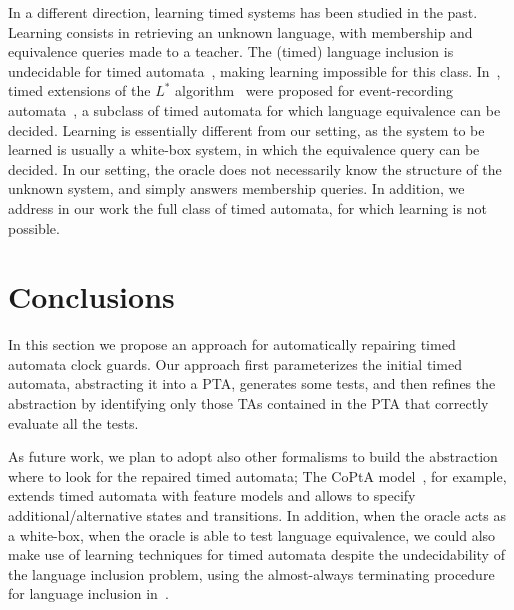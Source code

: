 \begin{tikzborder}{\cite{Gargantini16:validation}}
\begin{tikzborder}{\cite{gargantini_combinatorial_2017}}
\begin{tikzborder}{\cite{garn2019}}
\begin{tikzborder}{\cite{arcaini2019achieving}}
\begin{tikzborder}{\cite{arcaini2019varivolution}}


\vspace{5pt}

In a different direction, learning timed systems has been studied in the past.
Learning consists in retrieving an unknown language, with membership and equivalence queries made to a teacher.
The (timed) language inclusion is undecidable for timed automata~\cite{AD94}, making learning impossible for this class.
In~\cite{GJL10,LALSD14}, timed extensions of the $L^*$ algorithm~\cite{Angluin87} were proposed for event-recording automata~\cite{AFH99}, a subclass of timed automata for which language equivalence can be decided.
Learning is essentially different from our setting, as the system to be learned is usually a white-box system, in which the equivalence query can be decided.
In our setting, the oracle does not necessarily know the structure of the unknown system, and simply answers membership queries.
In addition, we address in our work the full class of timed automata, for which learning is not possible.
\end{tikzborder}


\section{Conclusions}\label{sec:conclusions2}

In this section we propose an approach for automatically repairing timed automata clock guards.
Our approach first parameterizes the initial timed automata, abstracting it into a PTA, generates some tests, and then refines the abstraction by identifying only those TAs contained in the PTA that correctly evaluate all the tests.

As future work, we plan to adopt also other formalisms to build the abstraction where to look for the repaired timed automata;
The CoPtA model~\cite{luthmann2019minimum}, for example, extends timed automata with feature models and allows to specify additional/alternative states and transitions.
In addition, when the oracle acts as a white-box, \ie{} when the oracle is able to test language equivalence, we could also make use of learning techniques for timed automata despite the undecidability of the language inclusion problem, using the almost-always terminating procedure for language inclusion in~\cite{WSLWL14}.


\end{tikzborder}
\end{tikzborder}
\end{tikzborder}
\end{tikzborder}
